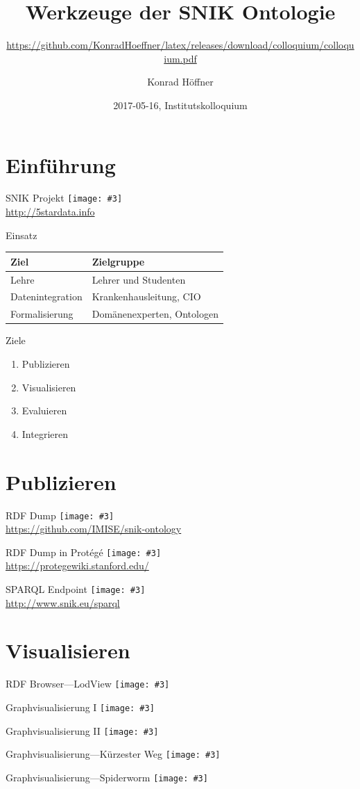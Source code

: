 \documentclass{beamer}
\author{Konrad Höffner}
\date{2017-05-16, Institutskolloquium}
\title{Werkzeuge der SNIK Ontologie}
\subtitle{\url{https://github.com/KonradHoeffner/latex/releases/download/colloquium/colloquium.pdf}}
\newcommand{\imageslide}[3][]
{
\begin{frame}{#2}
\centering\texttt{[image: \#3]}
\\#1
\end{frame}
}
\begin{document}
\begin{frame}
\titlepage
\end{frame}

\section{Einführung}

\imageslide[\url{http://5stardata.info}]{SNIK Projekt}{img/5star.png}

\begin{frame}{Einsatz}
\centering
\begin{tabular}{ll}
\toprule
\textbf{Ziel}	&\textbf{Zielgruppe}\\
\midrule
Lehre			&Lehrer und Studenten\\ 
Datenintegration	&Krankenhausleitung, CIO\\
Formalisierung		&Domänenexperten, Ontologen\\
\bottomrule
\end{tabular}
\end{frame}

\begin{frame}{Ziele}
\begin{enumerate}
\item Publizieren 
\item Visualisieren 
\item Evaluieren
\item Integrieren 
\end{enumerate}
\end{frame}

\section{Publizieren}

\imageslide[\url{https://github.com/IMISE/snik-ontology}]{RDF Dump}{img/rdfdump.png}
\imageslide[\url{https://protegewiki.stanford.edu/}]{RDF Dump in Protégé}{img/protege.png}
\imageslide[\url{http://www.snik.eu/sparql}]{SPARQL Endpoint}{img/sparqlresult.png}

\section{Visualisieren}

\imageslide{RDF Browser---LodView}{img/browse-cio.png}

\imageslide{Graphvisualisierung I}{img/graph-entitytype.png}
\imageslide{Graphvisualisierung II}{img/graph-erf.png}
\imageslide{Graphvisualisierung---Kürzester Weg}{img/shortestpath.png}
\imageslide{Graphvisualisierung---Spiderworm}{img/spiderworm.png}
\end{document}

